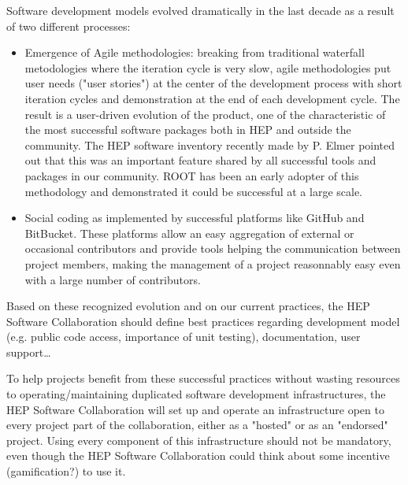 \documentclass[11pt]{article} %
\begin{document}
Software development models evolved dramatically in the last decade as
a result of two different processes:

\begin{itemize}
\item 
Emergence of Agile methodologies: breaking from traditional
waterfall metodologies where the iteration cycle is very slow, agile
methodologies put user needs ("user stories") at the center of the
development process with short iteration cycles and demonstration
at the end of each development cycle.
The result is a user-driven evolution of the product, one of the
characteristic of the most successful software packages both in HEP
and outside the community. 
The HEP software inventory recently made by P. Elmer pointed out that
this was an important feature shared by all successful tools and
packages in our community.
ROOT has been an early adopter of this methodology and demonstrated
it could be successful at a large scale.

\item 
Social coding as implemented by successful platforms like GitHub and
BitBucket.
These platforms allow an easy aggregation of external or occasional
contributors and provide tools helping the communication between
project members, making the management of a project reasonnably
easy even with a large number of contributors.

\end{itemize}

Based on these recognized evolution and on our current practices, the HEP Software Collaboration should define
best practices regarding development model (e.g. public code access, importance of unit testing), documentation, user support\ldots

To help projects benefit from these successful practices without wasting resources to
operating/maintaining duplicated software development infrastructures, the HEP Software Collaboration will
set up and operate an infrastructure open to every project part of the collaboration, either as a
"hosted" or as an "endorsed" project. Using every component of this infrastructure should not be mandatory,
even though the HEP Software Collaboration could think about some incentive (gamification?) to use it.  
\end{document}
